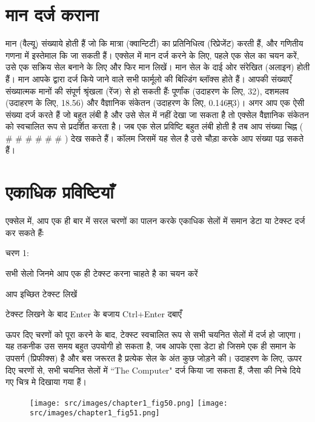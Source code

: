 \section{मान दर्ज कराना}\label{id-1.31}

मान (वैल्यू) संख्याये होती हैं जो कि मात्रा (क्वान्टिटी) का प्रतिनिधित्व (रिप्रेजेंट) करती हैं, और गणितीय गणना में इस्तेमाल कि जा सकती हैं। एक्सेल में मान दर्ज करने के लिए, पहले एक सेल का चयन करें, उसे एक सक्रिय सेल बनाने के लिए और फिर मान लिखें। मान सेल के दाई ओर संरेखित (अलाइन) होती हैं। मान आपके द्वारा दर्ज किये जाने वाले सभी फार्मूलो की बिल्डिंग ब्लॉक्स होते हैं। आपकी संख्याएँ संख्यात्मक मानों की संपूर्ण श्रृंखला (रेंज) से हो सकती हैंः पूर्णांक (उदाहरण के लिए, 32), दशमलव (उदाहरण के लिए, 18.56) और वैज्ञानिक संकेतन (उदाहरण के लिए, 0.146म़्3)। अगर आप एक ऐसी संख्या दर्ज करते हैं जो बहुत लंबी है और उसे सेल में नहीं देखा जा सकता है तो एक्सेल वैज्ञानिक संकेतन को स्वचालित रूप से प्रदर्शित करता है। जब एक सेल प्रविष्टि बहुत लंबी होती है तब आप संख्या चिह्न ( {\rm \# \# \# \# \# \#} ) देख सकते हैं। कॉलम जिसमें यह सेल है उसे चौड़ा करके आप संख्या पढ़ सकते हैं।

	
\section{एकाधिक प्रविष्टियाँ}\label{id-1.32}

एक्सेल में, आप एक ही बार में सरल चरणों का पालन करके एकाधिक सेलों में समान डेटा या टेक्स्ट दर्ज कर सकते हैंः

\begin{descriptionSimple}{चरण 1:}
\item[चरण 1]  सभी सेलो जिनमे आप एक ही टेक्स्ट करना चाहते है का चयन करें
\item[चरण 2]  आप इच्छित टेक्स्ट लिखें
\item[चरण 3]  टेक्स्ट लिखने के बाद  {\rm Enter}  के बजाय  {\rm Ctrl+Enter}  दबाएँ
\end{descriptionSimple}

ऊपर दिए चरणों को पूरा करने के बाद, टेक्स्ट स्वचालित रूप से सभी चयनित सेलों में दर्ज हो जाएगा। यह तकनीक उस समय बहुत उपयोगी हो सकता है, जब आपके एसा डेटा हो जिसमे एक ही समान के उपसर्ग (प्रिफीक्स) है और बस जरूरत है प्रत्येक सेल के अंत कुछ जोड़ने की। उदाहरण के लिए, ऊपर दिए चरणों से, सभी चयनित सेलों में  {\rm ``The Computer"}  दर्ज किया जा सकता हैं, जैसा की निचे दिये गए चित्र मे दिखाया गया हैं।

\begin{figure}[H]
\centering
\texttt{[image: src/images/chapter1\_fig50.png]}\qquad
\texttt{[image: src/images/chapter1\_fig51.png]}
\end{figure}									

